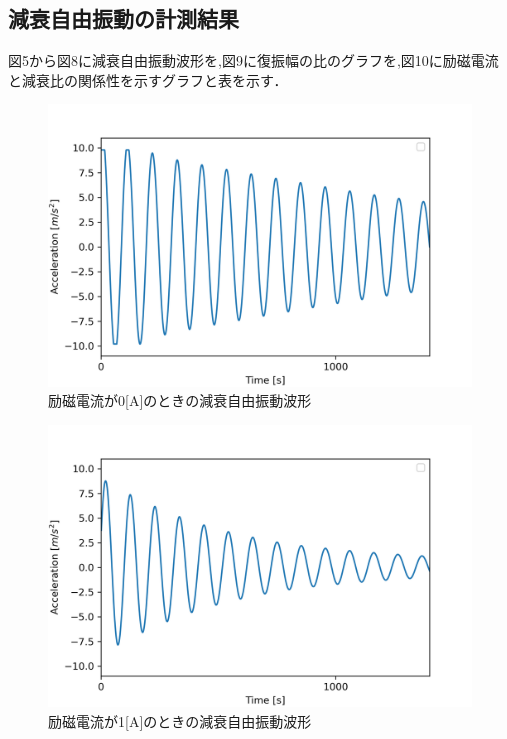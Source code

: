 \documentclass[a4paper,10.5pt]{jsarticle}
\begin{document}
\subsection{減衰自由振動の計測結果}
図5から図8に減衰自由振動波形を,図9に復振幅の比のグラフを,図10に励磁電流と減衰比の関係性を示すグラフと表を示す．
\newpage
\begin{figure}[h]
  \centering
  \includegraphics[width=13cm]{damp0.png}
  \caption{励磁電流が0[A]のときの減衰自由振動波形}
\end{figure}
\begin{figure}[h]
  \centering
  \includegraphics[width=13cm]{damp1.png}
  \caption{励磁電流が1[A]のときの減衰自由振動波形}
\end{figure}
\newpage
\end{document}
